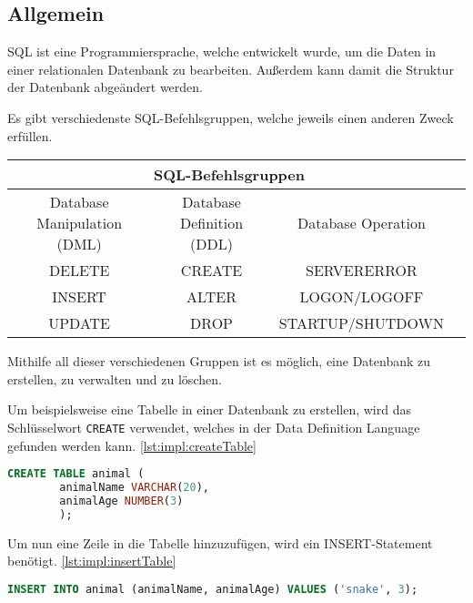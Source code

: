 \subsection{Allgemein}
SQL ist eine Programmiersprache, welche entwickelt wurde, um die Daten in einer relationalen Datenbank zu bearbeiten. Außerdem kann damit die Struktur der Datenbank abgeändert werden.
 
Es gibt verschiedenste SQL-Befehlsgruppen, welche jeweils einen anderen Zweck erfüllen.
 
\begin{center}
    \begin{tabular}{ |c|c|c|c| }
     \hline
     \multicolumn{3}{|c|}{SQL-Befehlsgruppen } \\
     \hline
     \hline
     Database Manipulation (DML) & Database Definition (DDL) & Database Operation  \\
     \hline
     \hline
     DELETE & CREATE & SERVERERROR \\
     \hline
     INSERT & ALTER & LOGON/LOGOFF \\
     \hline
     UPDATE & DROP & STARTUP/SHUTDOWN \\
     \hline
    \end{tabular}
    \end{center}
 
Mithilfe all dieser verschiedenen Gruppen ist es möglich, eine Datenbank zu erstellen, zu verwalten und zu löschen.
 
Um beispielsweise eine Tabelle in einer Datenbank zu erstellen, wird das Schlüsselwort \texttt{CREATE} verwendet, welches in der Data Definition Language gefunden werden kann. \ref{lst:impl:createTable}
 
\begin{lstlisting}[language=sql,caption=CREATE table,label=lst:impl:createTable]
    CREATE TABLE animal (
        animalName VARCHAR(20),
        animalAge NUMBER(3)
        );
\end{lstlisting}
 
Um nun eine Zeile in die Tabelle hinzuzufügen, wird ein INSERT-Statement benötigt. \ref{lst:impl:insertTable}
 
\begin{lstlisting}[language=sql,caption=CREATE table,label=lst:impl:insertTable]
        INSERT INTO animal (animalName, animalAge) VALUES ('snake', 3);
\end{lstlisting}
 
